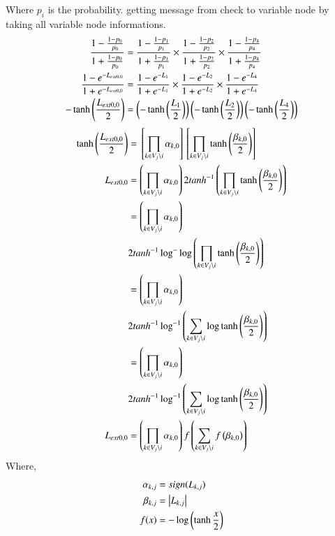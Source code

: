 \documentclass[journal,12pt,twocolumn]{IEEEtran}
\begin{document}
\begin{enumerate}
Where $p_i$ is the probability. getting message from check to variable node by taking all variable node informations.
\begin{align}
\frac{1-\frac{1-p_0}{p_0}}{1+\frac{1-p_0}{p_0}} & = \frac{1-\frac{1-p_1}{p_1}}{1+\frac{1-p_1}{p_1}} \times \frac{1-\frac{1-p_2}{p_2}}{1+\frac{1-p_2}{p_2}} \times \frac{1-\frac{1-p_4}{p_4}}{1+\frac{1-p_4}{p_4}}\\
\frac{1-e^{-L_{ext0,0}}}{1+e^{-L_{ext0,0}}} &=\frac{1-e^{-L_{1}}}{1+e^{-L_{1}}}\times \frac{1-e^{-L_{2}}}{1+e^{-L_{2}}} \times \frac{1-e^{-L_{4}}}{1+e^{-L_{4}}}\\ \nonumber
-\tanh \left(\frac{L_{ext0,0}}{2}\right)& =\left(-\tanh \left(\frac{L_{1}}{2}\right)\right)\left(-\tanh \left(\frac{L_{2}}{2}\right)\right)\left( -\tanh \left(\frac{L_{4}}{2}\right) \right)
\end{align}
\begin{align}
\tanh \left(\frac{L_{ext0,0}}{2}\right) &={}\left[\prod_{k \in V_j \setminus i}\alpha_{k,0}\right]{}\left[\prod_{k \in V_j \setminus i} \tanh \left(\frac{\beta_{k,0}}{2}\right)\right]\\
L_{ext0,0}  &=\left(\prod_{k \in V_j \setminus i}\alpha_{k,0}\right)2 tanh^{-1}\left(\prod_{k \in V_j \setminus i} \tanh \left(\frac{\beta_{k,0}}{2}\right)\right)\\
&=\left(\prod_{k \in V_j \setminus i}\alpha_{k,0}\right)\\
&2 tanh^{-1}\log^- \log\left(\prod_{k \in V_j \setminus i} \tanh \left(\frac{\beta_{k,0}}{2}\right)\right)\\
&=\left(\prod_{k \in V_j \setminus i}\alpha_{k,0}\right)\\
&2 tanh^{-1}\log^{-1}\left(\sum_{k \in V_j \setminus i} \log \tanh \left(\frac{\beta_{k,0}}{2}\right)\right)\\
&=\left(\prod_{k \in V_j \setminus i}\alpha_{k,0}\right)\\
&2 tanh^{-1}\log^{-1}\left(\sum_{k \in V_j \setminus i} \log \tanh \left(\frac{\beta_{k,0}}{2}\right)\right)\\
L_{ext0,0}&=\left(\prod_{k \in V_j \setminus i}\alpha_{k,0}\right) f\left(\sum_{k \in V_j \setminus i}f\left(\beta_{k,0}\right)\right) \label{eq:main}
\end{align}
Where,
\begin{align}
\alpha_{k,j}&=sign(L_{k,j})\\
\beta_{k,j}&=\left\vert L_{k,j}\right\vert\\
f(x)&= - \log \left(\tanh{\frac{x}{2}}\right)
\end{align}
 \begin{figure}[!ht]
\begin{center}

\end{center}
\end{figure}
\end{enumerate}
\end{document}
